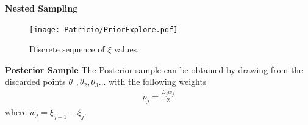 \begin{frame}{\small{\textbf{Nested Sampling}}}
\begin{figure}[]    		
		\texttt{[image: Patricio/PriorExplore.pdf]}
		\caption{Discrete sequence of $\xi$ values.}
\end{figure}
\end{frame}
\begin{frame}{\small{\textbf{Posterior Sample}}}
The Posterior sample can be obtained by drawing from the discarded points $\theta_1,\theta_2,\theta_3 \ldots$ with the following weights
\begin{align*}
p_{j} = \frac{L_{j} w_{j}}{Z} 
\end{align*}
where $w_{j}=\xi_{j-1} - \xi_{j}$.
\\~\\
\end{frame}


